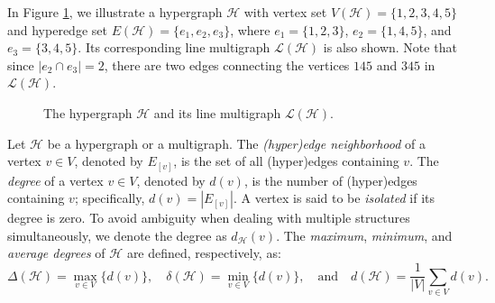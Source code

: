 \documentclass[12pt,reqno]{amsart}
\begin{document}
\begin{example}
In Figure \ref{fig:multi-lin}, we illustrate a hypergraph $\mathcal{H}$ with vertex set $V(\mathcal{H})=\{1,2,3,4,5\}$ and hyperedge set $E(\mathcal{H})=\{e_1, e_2, e_3\}$, where $e_1=\{1,2,3\}$, $e_2=\{1,4,5\}$, and $e_3=\{3,4,5\}$. Its corresponding line multigraph $\mathcal{L}(\mathcal{H})$ is also shown. Note that since $|e_2 \cap e_3| = 2$, there are two edges connecting the vertices $145$ and $345$ in $\mathcal{L}(\mathcal{H})$.

\begin{figure}[!h]	
	\centering	
	\quad
	\caption{The hypergraph $\mathcal{H}$ and its line multigraph $\mathcal{L}(\mathcal{H})$.}\label{fig:multi-lin}
\end{figure}  
\end{example}

\begin{definition}
Let $\mathcal{H}$ be a hypergraph or a multigraph. The \textit{(hyper)edge neighborhood} of a vertex $v \in V$, denoted by $E_{[v]}$, is the set of all (hyper)edges containing $v$. The \textit{degree} of a vertex $v \in V$, denoted by $d(v)$, is the number of (hyper)edges containing $v$; specifically, $d(v) = |E_{[v]}|$. A vertex is said to be \textit{isolated} if its degree is zero. To avoid ambiguity when dealing with multiple structures simultaneously, we denote the degree as $d_{\mathcal{H}}(v)$. The \textit{maximum}, \textit{minimum}, and \textit{average degrees} of $\mathcal{H}$ are defined, respectively, as:
$$\Delta(\mathcal{H}) = \max_{v \in V}\{d(v)\}, \quad \delta(\mathcal{H}) = \min_{v \in V}\{d(v)\}, \quad \text{and} \quad d(\mathcal{H}) = \frac{1}{|V|}\sum_{v \in V}d(v).$$
\end{definition}
\end{document}
